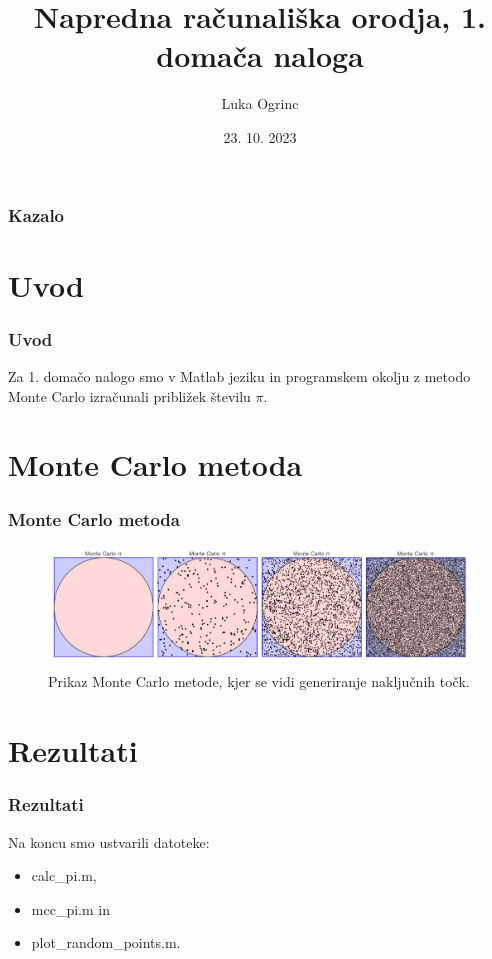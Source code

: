 \documentclass{beamer}
\title{Napredna računališka orodja, 1. domača naloga}
\author{Luka Ogrinc}
\institute{Univerza v Ljubljani, Fakulteta za strojništvo}
\date{23. 10. 2023}
\begin{document}
\frame{\titlepage}

\begin{frame}
\frametitle{Kazalo}
\tableofcontents
\end{frame}

\section{Uvod}

\begin{frame}
\frametitle{Uvod}
Za 1. domačo nalogo smo v Matlab jeziku in programskem okolju z metodo Monte Carlo izračunali približek številu $\pi$.
\end{frame}


\section{Monte Carlo metoda}

\begin{frame}
\frametitle{Monte Carlo metoda}
\begin{figure}
\centering
\includegraphics[width=1\textwidth]{slika.jpg}
\caption{Prikaz Monte Carlo metode, kjer se vidi generiranje naključnih točk.}
\end{figure}
\end{frame}

\section{Rezultati}

\begin{frame}
\frametitle{Rezultati}
Na koncu smo ustvarili datoteke:
\begin{itemize}
  \item calc\_pi.m,
  \pause
  \item mcc\_pi.m in
  \pause
  \item plot\_random\_points.m.
\end{itemize}
\end{frame}
\end{document}
